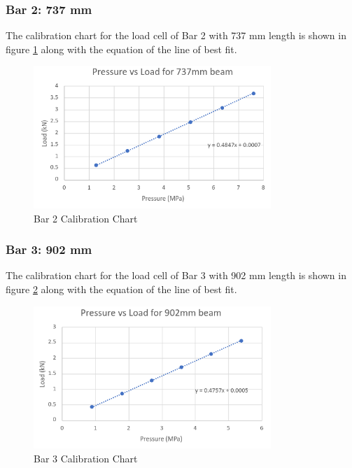 \documentclass[12pt, titlepage]{article}
\begin{document}
\subsubsection{Bar 2: 737 mm}
The calibration chart for the load cell of Bar 2 with 737 mm length is shown
in figure \ref{fig:bar2calib} along with the equation of the line of best fit.
\begin{figure}[H]
    \centering
    \includegraphics[width=0.8\textwidth]{./Images/737.png}
    \caption{Bar 2 Calibration Chart}
    \label{fig:bar2calib}
\end{figure}
\subsubsection{Bar 3: 902 mm}
The calibration chart for the load cell of Bar 3 with 902 mm length is shown
in figure \ref{fig:bar3calib} along with the equation of the line of best fit.
\begin{figure}[H]
    \centering
    \includegraphics[width=0.8\textwidth]{./Images/902.png}
    \caption{Bar 3 Calibration Chart}
    \label{fig:bar3calib}
\end{figure}
\end{document}

